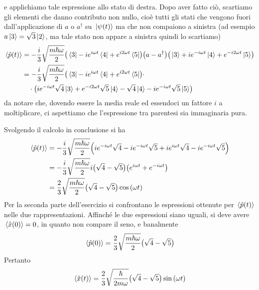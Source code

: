 \begin{soluzione}
   e applichiamo tale espressione allo stato di destra. Dopo aver fatto ciò, scartiamo gli elementi che danno contributo non nullo, cioè tutti gli stati che vengono fuori dall'applicazione di $a$ o $a^{\dag}$ su $\ket*{\psi(t)}$ ma che non compaiono a sinistra (ad esempio $a\ket*{3}=\sqrt{3}\ket*{2}$, ma tale stato non appare a sinistra quindi lo scartiamo)
   \begin{equation*}
      \begin{split}
         \expval*{\hat{p}(t)}
         & =-\frac{i}{3} \sqrt{\frac{m \hbar \omega}{2}}
         \qty( \bra*{3} - i e^{i\omega t} \bra*{4} + e^{i2\omega t} \bra*{5})
         \bigl( a - a^{\dag} \bigr)
         \qty( \ket*{3} + i e^{-i\omega t} \ket*{4} + e^{-i2\omega t} \ket*{5})
         \\
         & =-\frac{i}{3} \sqrt{\frac{m \hbar \omega}{2}}
         \qty( \bra*{3} - i e^{i\omega t} \bra*{4} + e^{i2\omega t} \bra*{5}) \cdot
         \\
         & \quad \cdot \bigl( i e^{-i\omega t} \sqrt{4} \ket*{3} + e^{-i2\omega t} \sqrt{5} \ket*{4} - \sqrt{4}\ket*{4} - i e^{-i\omega t} \sqrt{5} \ket*{5} \bigr)
      \end{split}
   \end{equation*}
   \E da notare che, dovendo essere la media reale ed essendoci un fattore $i$ a moltiplicare, ci aspettiamo che l'espressione tra parentesi sia immaginaria pura.

   Svolgendo il calcolo in conclusione si ha
   \begin{equation*}
      \begin{split}
         \expval*{\hat{p}(t)}
         & =-\frac{i}{3} \sqrt{\frac{m \hbar \omega}{2}} \qty( i e^{-i\omega t} \sqrt{4} - i e^{-i\omega t} \sqrt{5} + i e^{i\omega t} \sqrt{4} - i e^{-i\omega t} \sqrt{5})
         \\
         & =-\frac{i}{3} \sqrt{\frac{m \hbar \omega}{2}} i \bigl( \sqrt{4} - \sqrt{5} \bigr) \qty( e^{i\omega t} + e^{-i\omega t} )
         \\
         & =\frac{2}{3} \sqrt{\frac{m \hbar \omega}{2}} \bigl( \sqrt{4} - \sqrt{5} \bigr) \cos{(\omega t)}
      \end{split}
   \end{equation*}
   Per la seconda parte dell'esercizio si confrontano le espressioni ottenute per $\expval*{\hat{p}(t)}$ nelle due rappresentazioni. Affinché le due espressioni siano uguali, si deve avere $\expval*{\hat{x}(0)}=0$, in quanto non compare il seno, e banalmente
   \begin{equation*}
      \expval*{\hat{p}(0)}
      =\frac{2}{3} \sqrt{\frac{m \hbar \omega}{2}} \bigl( \sqrt{4} - \sqrt{5} \bigr)
   \end{equation*}
   Pertanto
   \begin{equation*}
      \expval*{\hat{x}(t)}=\frac{2}{3} \sqrt{\frac{\hbar}{2m\omega}} \bigl( \sqrt{4} - \sqrt{5} \bigr) \sin{(\omega t)}
   \end{equation*}
\end{soluzione}